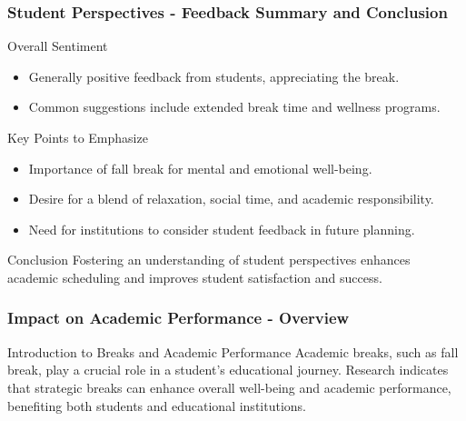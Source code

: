 \documentclass[aspectratio=169]{beamer}
\begin{document}
\begin{frame}[fragile]
    \frametitle{Student Perspectives - Feedback Summary and Conclusion}
    \begin{block}{Overall Sentiment}
        \begin{itemize}
            \item Generally positive feedback from students, appreciating the break.
            \item Common suggestions include extended break time and wellness programs.
        \end{itemize}
    \end{block}
    
    \begin{block}{Key Points to Emphasize}
        \begin{itemize}
            \item Importance of fall break for mental and emotional well-being.
            \item Desire for a blend of relaxation, social time, and academic responsibility.
            \item Need for institutions to consider student feedback in future planning.
        \end{itemize}
    \end{block}
    
    \begin{block}{Conclusion}
        Fostering an understanding of student perspectives enhances academic scheduling and improves student satisfaction and success.
    \end{block}
\end{frame}

\begin{frame}[fragile]
    \frametitle{Impact on Academic Performance - Overview}
    \begin{block}{Introduction to Breaks and Academic Performance}
        Academic breaks, such as fall break, play a crucial role in a student's educational journey. 
        Research indicates that strategic breaks can enhance overall well-being and academic performance, benefiting both students and educational institutions.
    \end{block}
\end{frame}
\end{document}
